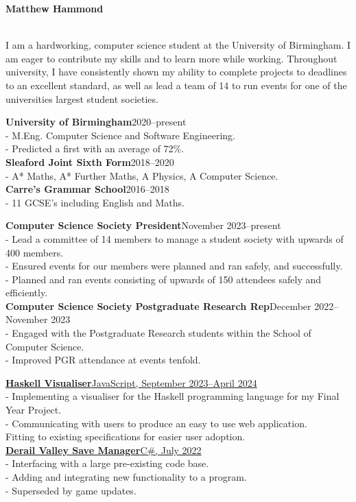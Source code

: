 \documentclass[twoside]{article}
\begin{document}
\begin{center}
    \noindent\huge\textbf{Matthew Hammond}
\end{center}\hr
{}
\hfill
{}\\
\hfill
{}\hr
I am a hardworking, computer science student at the University of Birmingham. I am eager to contribute my skills and to learn more while working. Throughout university, I have consistently shown my ability to complete projects to deadlines to an excellent standard, as well as lead a team of 14 to run events for one of the universities largest student societies.

\textbf{University of Birmingham}\hfill 2020--present\\
- M.Eng. Computer Science and Software Engineering.\\
- Predicted a first with an average of 72\%.\\
\textbf{Sleaford Joint Sixth Form}\hfill 2018--2020\\
- A* Maths, A* Further Maths, A Physics, A Computer Science.\\
\textbf{Carre’s Grammar School}\hfill 2016--2018\\
- 11 GCSE's including English and Maths.

\textbf{Computer Science Society President}\hfill November 2023--present\\
- Lead a committee of 14 members to manage a student society with upwards of 400 members.\\
- Ensured events for our members were planned and ran safely, and successfully.\\
- Planned and ran events consisting of upwards of 150 attendees safely and efficiently.\\
\textbf{Computer Science Society Postgraduate Research Rep}\hfill December 2022--November 2023\\
- Engaged with the Postgraduate Research students within the School of Computer Science.\\
- Improved PGR attendance at events tenfold.

\href{https://github.com/FrozenDude101/masters-project}{\textbf{Haskell Visualiser}\hfill JavaScript, September 2023--April 2024}\\
- Implementing a visualiser for the Haskell programming language for my Final Year Project.\\
- Communicating with users to produce an easy to use web application.\\
Fitting to existing specifications for easier user adoption.\\
\href{https://github.com/FrozenDude101/DV-SaveManager}{\textbf{Derail Valley Save Manager}\hfill C\#, July 2022}\\
- Interfacing with a large pre-existing code base.\\
- Adding and integrating new functionality to a program.\\
- Superseded by game updates.
\end{document}
